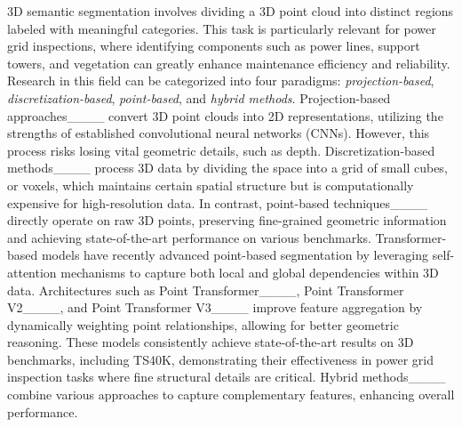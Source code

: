 3D semantic segmentation involves dividing a 3D point cloud into distinct regions labeled with meaningful categories. This task is particularly relevant for power grid inspections, where identifying components such as power lines, support towers, and vegetation can greatly enhance maintenance efficiency and reliability. Research in this field can be categorized into four paradigms: \textit{projection-based}, \textit{discretization-based}, \textit{point-based}, and \textit{hybrid methods}.
%
Projection-based approaches____ convert 3D point clouds into 2D representations, utilizing the strengths of established convolutional neural networks (CNNs). However, this process risks losing vital geometric details, such as depth.
%
Discretization-based methods____ process 3D data by dividing the space into a grid of small cubes, or voxels, which maintains certain spatial structure but is computationally expensive for high-resolution data.
%
In contrast, point-based techniques____ directly operate on raw 3D points, preserving fine-grained geometric information and achieving state-of-the-art performance on various benchmarks.
%
Transformer-based models have recently advanced point-based segmentation by leveraging self-attention mechanisms to capture both local and global dependencies within 3D data. Architectures such as Point Transformer____, Point Transformer V2____, and Point Transformer V3____ improve feature aggregation by dynamically weighting point relationships, allowing for better geometric reasoning. These models consistently achieve state-of-the-art results on 3D benchmarks, including TS40K, demonstrating their effectiveness in power grid inspection tasks where fine structural details are critical.
%
Hybrid methods____ combine various approaches to capture complementary features, enhancing overall performance.


